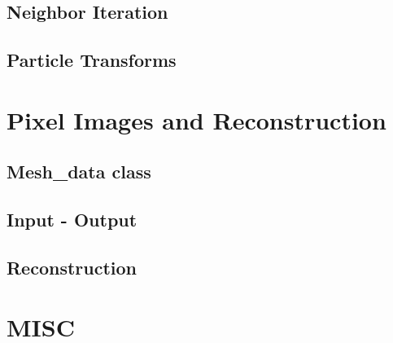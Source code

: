 \documentclass[12pt]{article}
\begin{document}
\subsection{Neighbor Iteration}


\subsection{Particle Transforms}

\section{Pixel Images and Reconstruction}
\subsection{Mesh\_data class}

\subsection{Input - Output}

\subsection{Reconstruction}

\section{MISC}
\end{document}
